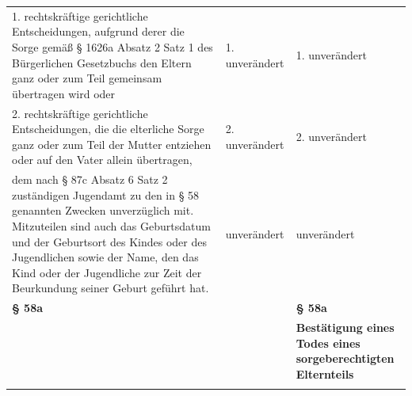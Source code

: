 \documentclass[10pt,a4paper,landscape]{article}
\begin{document}
\begin{longtable}{|L{8.2cm}|L{8.2cm}|L{8.2cm}|}
\hhline{|---|}
1.  \newline rechtskräftige gerichtliche Entscheidungen,  \newline aufgrund derer die Sorge gemäß \S{} 1626a  \newline Absatz 2 Satz 1 des Bürgerlichen  \newline Gesetzbuchs den Eltern ganz oder zum  \newline Teil gemeinsam übertragen wird oder & 1. unverändert & 1. unverändert \\
\hhline{|---|}
2.  \newline rechtskräftige gerichtliche Entscheidungen,  \newline die die elterliche Sorge ganz oder zum Teil  \newline der Mutter entziehen oder auf den Vater  \newline allein übertragen, & 2. unverändert & 2. unverändert \\
\hhline{|---|}
dem nach \S{} 87c Absatz 6 Satz 2  \newline zuständigen Jugendamt zu den in \S{} 58  \newline genannten Zwecken unverzüglich mit.  \newline Mitzuteilen sind auch das Geburtsdatum  \newline und der Geburtsort des Kindes oder des  \newline Jugendlichen sowie der Name, den das  \newline Kind oder der Jugendliche zur Zeit der  \newline Beurkundung seiner Geburt geführt hat. & unverändert & unverändert \\
\hhline{|---|}
\textbf{\S{} 58a} &  & \textbf{\S{} 58a } \\
\hhline{|---|}
 &  & \textbf{\textcolor{diffgreen}{Bestätigung eines Todes eines  \newline sorgeberechtigten Elternteils}} \\
\hhline{|---|}

\end{longtable}
\end{document}
